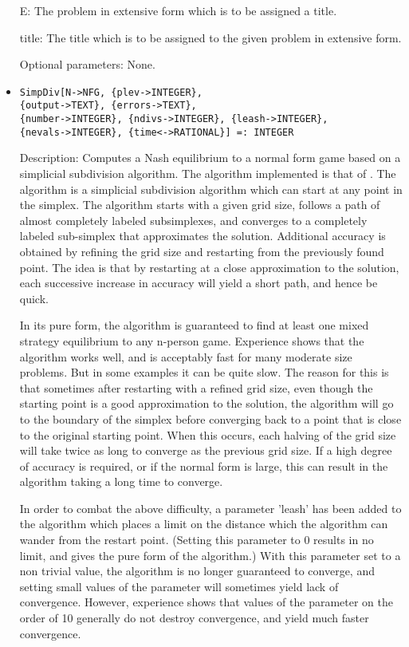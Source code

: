 \begin{itemize}
\bd
\item
[E:] The problem in extensive form which is to be assigned a title.
\item
[title:] The title which is to be assigned to the given problem in
extensive form.
\ed

\item
[Optional parameters:] None.
\ed

\item
\protect \large \begin{verbatim}
SimpDiv[N->NFG, {plev->INTEGER},
{output->TEXT}, {errors->TEXT},
{number->INTEGER}, {ndivs->INTEGER}, {leash->INTEGER},
{nevals->INTEGER}, {time<->RATIONAL}] =: INTEGER
\end{verbatim}\normalsize

\bd
\item
[Description:] Computes a Nash equilibrium to a normal form game based
on a simplicial subdivision algorithm.  The algorithm implemented is
that of \cite{VTH:1987}.  The 
algorithm is a simplicial subdivision algorithm which can start at any
point in the simplex.  The algorithm starts with a given grid size,
follows a path of almost completely labeled subsimplexes, and
converges to a completely labeled sub-simplex that approximates the
solution.  Additional accuracy is obtained by refining the grid size
and restarting from the previously found point.  The idea is that by
restarting at a close approximation to the solution, each successive
increase in accuracy will yield a short path, and hence be quick.

In its pure form, the algorithm is guaranteed to find at least one
mixed strategy equilibrium to any n-person game.  Experience shows
that the algorithm works well, and is acceptably fast for many
moderate size problems.  But in some examples it can be quite slow.
The reason for this is that sometimes after restarting with a refined
grid size, even though the starting point is a good approximation to
the solution, the algorithm will go to the boundary of the simplex
before converging back to a point that is close to the original
starting point.  When this occurs, each halving of the grid size will
take twice as long to converge as the previous grid size.  If a high
degree of accuracy is required, or if the normal form is large, this
can result in the algorithm taking a long time to converge.

In order to combat the above difficulty, a parameter 'leash' has been
added to the algorithm which places a limit on the distance which the
algorithm can wander from the restart point. (Setting this parameter
to 0 results in no limit, and gives the pure form of the algorithm.)
With this parameter set to a non trivial value, the algorithm is no
longer guaranteed to converge, and setting small values of the
parameter will sometimes yield lack of convergence.  However,
experience shows that values of the parameter on the order of 10
generally do not destroy convergence, and yield much faster
convergence.


\end{itemize}
